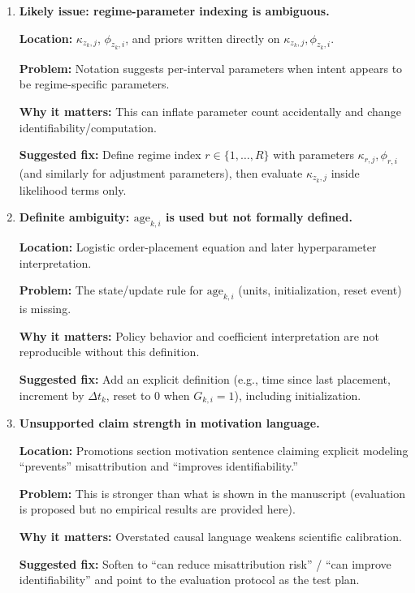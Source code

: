 \documentclass[11pt]{article}
\begin{document}
\begin{enumerate}[leftmargin=*]
\textbf{Why it matters:} Inconsistent approximations can under- or over-state buffer stock and trigger frequency.

\textbf{Suggested fix:} Either (i) keep the product model and use a variance formula consistent with it (including stated independence/covariance assumptions), or (ii) redefine $d$ as per-period demand in a summed lead-time-demand model and present the corresponding standard formula clearly.

\item \textbf{Likely issue: regime-parameter indexing is ambiguous.}

\textbf{Location:} $\kappa_{z_k,j}$, $\phi_{z_k,i}$, and priors written directly on $\kappa_{z_k,j},\phi_{z_k,i}$.

\textbf{Problem:} Notation suggests per-interval parameters when intent appears to be regime-specific parameters.

\textbf{Why it matters:} This can inflate parameter count accidentally and change identifiability/computation.

\textbf{Suggested fix:} Define regime index $r\in\{1,\dots,R\}$ with parameters $\kappa_{r,j},\phi_{r,i}$ (and similarly for adjustment parameters), then evaluate $\kappa_{z_k,j}$ inside likelihood terms only.

\item \textbf{Definite ambiguity: $\text{age}_{k,i}$ is used but not formally defined.}

\textbf{Location:} Logistic order-placement equation and later hyperparameter interpretation.

\textbf{Problem:} The state/update rule for $\text{age}_{k,i}$ (units, initialization, reset event) is missing.

\textbf{Why it matters:} Policy behavior and coefficient interpretation are not reproducible without this definition.

\textbf{Suggested fix:} Add an explicit definition (e.g., time since last placement, increment by $\Delta t_k$, reset to 0 when $G_{k,i}=1$), including initialization.

\item \textbf{Unsupported claim strength in motivation language.}

\textbf{Location:} Promotions section motivation sentence claiming explicit modeling ``prevents'' misattribution and ``improves identifiability.''

\textbf{Problem:} This is stronger than what is shown in the manuscript (evaluation is proposed but no empirical results are provided here).

\textbf{Why it matters:} Overstated causal language weakens scientific calibration.

\textbf{Suggested fix:} Soften to ``can reduce misattribution risk'' / ``can improve identifiability'' and point to the evaluation protocol as the test plan.

\end{enumerate}
\end{document}
